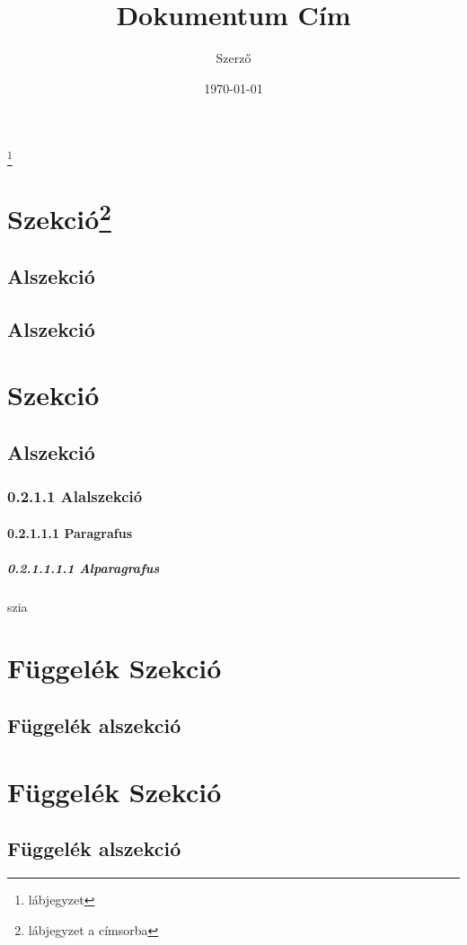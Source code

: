 \documentclass[a4paper,12pt,twoside]{book}
\begin{document}
\title{Dokumentum Cím}
\author{Szerző}
\date{\today}
\maketitle
\hulipsum[2]
\footnote{lábjegyzet}
\setcounter{tocdepth}{3}
\tableofcontents
\newpage
{} 
\section[Szek.]{Szekció\footnote{lábjegyzet a címsorba}}
\hulipsum[2-3]
\subsection{Alszekció}
\hulipsum[10]
\subsection{Alszekció}
\hulipsum[10]
\section{Szekció}
\hulipsum[2-3]
\subsection{Alszekció}
\hulipsum[1]
\subsubsection{0.2.1.1 Alalszekció}
\hulipsum[1]
\paragraph{0.2.1.1.1 Paragrafus}
\hulipsum[1]
\subparagraph{0.2.1.1.1.1 Alparagrafus}
szia
\appendix
\section{Függelék Szekció}
\hulipsum[1]
\subsection{Függelék alszekció}
\hulipsum[1]
\section{Függelék Szekció}
\hulipsum[1]
\subsection{Függelék alszekció}
\hulipsum[1]
\end{document}

